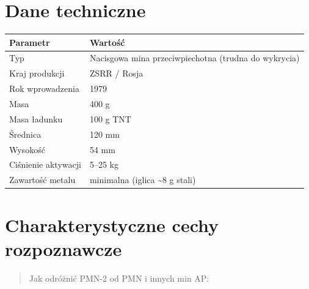 \documentclass[12pt,openany,oneside]{book}
\begin{document}
\section{Dane techniczne}\label{dane-techniczne-108}

\begin{longtable}[]{@{}ll@{}}
\toprule\noalign{}
Parametr & Wartość \\
\midrule\noalign{}
\endhead
\bottomrule\noalign{}
\endlastfoot
Typ & Nacisgowa mina przeciwpiechotna (trudna do wykrycia) \\
Kraj produkcji & ZSRR / Rosja \\
Rok wprowadzenia & 1979 \\
Masa & 400 g \\
Masa ładunku & 100 g TNT \\
Średnica & 120 mm \\
Wysokość & 54 mm \\
Ciśnienie aktywacji & 5--25 kg \\
Zawartość metalu & minimalna (iglica \textasciitilde8 g stali) \\
\end{longtable}

\section{Charakterystyczne cechy
rozpoznawcze}\label{charakterystyczne-cechy-rozpoznawcze-108}

\begin{quote}
Jak odróżnić PMN-2 od PMN i innych min AP:
\end{quote}
\end{document}
